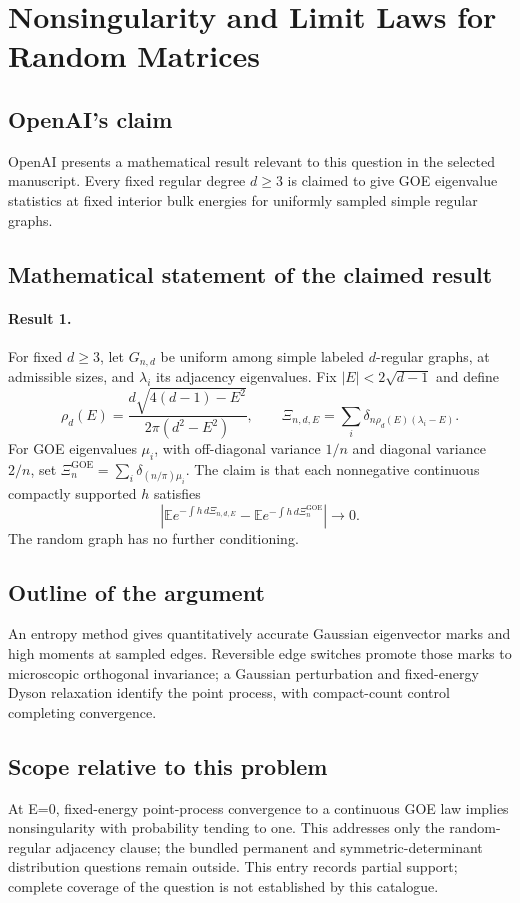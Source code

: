 \documentclass[11pt]{article}
\begin{document}
\section*{Nonsingularity and Limit Laws for Random Matrices}

\subsection{OpenAI's claim}
OpenAI presents a mathematical result relevant to this question in the selected manuscript. Every fixed regular degree $d\geq3$ is claimed to give GOE eigenvalue statistics at fixed interior bulk energies for uniformly sampled simple regular graphs.

\subsection{Mathematical statement of the claimed result}
\paragraph{Result 1.} For fixed \(d\ge3\), let \(G_{n,d}\) be uniform among simple labeled \(d\)-regular graphs, at admissible sizes, and \(\lambda_i\) its adjacency eigenvalues. Fix \(|E|<2\sqrt{d-1}\) and define
\[
 \rho_d(E)=\frac{d\sqrt{4(d-1)-E^2}}{2\pi(d^2-E^2)},\qquad
 \Xi_{n,d,E}=\sum_i\delta_{n\rho_d(E)(\lambda_i-E)}.
\]
For GOE eigenvalues \(\mu_i\), with off-diagonal variance \(1/n\) and diagonal variance \(2/n\), set \(\Xi_n^{\mathrm{GOE}}=\sum_i\delta_{(n/\pi)\mu_i}\). The claim is that each nonnegative continuous compactly supported \(h\) satisfies
\[
 \left|\mathbb E e^{-\int h\,d\Xi_{n,d,E}}
 -\mathbb E e^{-\int h\,d\Xi_n^{\mathrm{GOE}}}\right|\to0.
\]
The random graph has no further conditioning.

\subsection{Outline of the argument}
An entropy method gives quantitatively accurate Gaussian eigenvector marks and high moments at sampled edges. Reversible edge switches promote those marks to microscopic orthogonal invariance; a Gaussian perturbation and fixed-energy Dyson relaxation identify the point process, with compact-count control completing convergence.

\subsection{Scope relative to this problem}
At E=0, fixed-energy point-process convergence to a continuous GOE law implies nonsingularity with probability tending to one. This addresses only the random-regular adjacency clause; the bundled permanent and symmetric-determinant distribution questions remain outside. This entry records partial support; complete coverage of the question is not established by this catalogue.
\end{document}
